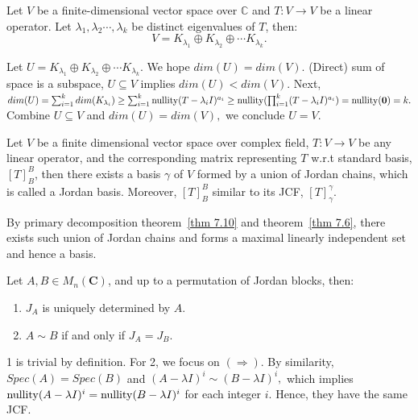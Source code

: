 \begin{theorem}
    Let $V$ be a finite-dimensional vector space over $\mathbb{C}$ and $T:V\to V$ be a linear operator. Let $\lambda_1,\lambda_2\cdots,\lambda_k$ be distinct eigenvalues of $T$, then:
    $$V=K_{\lambda_1}\oplus K_{\lambda_2}\oplus\cdots K_{\lambda_k}.$$
    \label{thm 7.10}
\end{theorem}

\begin{pfbox}
    Let $U=K_{\lambda_1}\oplus K_{\lambda_2}\oplus\cdots K_{\lambda_k}.$ We hope $dim(U)=dim(V).$
    (Direct) sum of space is a subspace, $U\subseteq V$ implies $dim(U)<dim(V).$
    Next, $dim(U)=\sum_{i=1}^{k}dim(K_{\lambda_i})\ge \sum_{i=1}^{k}\operatorname{nullity}(T-\lambda_i I)^{a_i}\ge\operatorname{nullity}(\prod_{i=1}^{k}(T-\lambda_i I)^{a_i})=\operatorname{nullity}(\mathbf{0})=k.$
    Combine $U\subseteq V$ and $dim(U)=dim(V),$ we conclude $U=V.$
\end{pfbox}

\begin{theorem}
    Let $V$ be a finite dimensional vector space over complex field, $T:V\to V$ be any linear operator, and the corresponding matrix representing $T$ w.r.t standard basis, $[T]^B_B$, 
    then there exists a basis $\gamma$ of $V$ formed by a union of Jordan chains, which is called a Jordan basis. Moreover, $[T]^B_B$ similar to its JCF, $[T]^\gamma_\gamma$.  
\end{theorem}

\begin{pfbox}
    By primary decomposition theorem~\eqref{thm 7.10} and theorem~\eqref{thm 7.6}, there exists such union of Jordan chains and forms a maximal linearly independent set and hence a basis.
\end{pfbox}

\begin{theorem}
Let $A,B\in M_n(\mathbf{C})$, and up to a permutation of Jordan blocks, then:
    \begin{enumerate}
    \item $J_A$ is uniquely determined by $A.$
    \item $A\sim B$ if and only if $J_A=J_B.$
\end{enumerate}
\end{theorem}

\begin{pfbox}
    1 is trivial by definition. For 2, we focus on $(\Rightarrow)$. By similarity, $Spec(A)=Spec(B)$ and $(A-\lambda I)^i \sim (B-\lambda I)^i,$ which implies $\operatorname{nullity}(A-\lambda I)^i = \operatorname{nullity}(B-\lambda I)^i$ for each integer $i$. Hence, they have the same JCF. 
\end{pfbox}